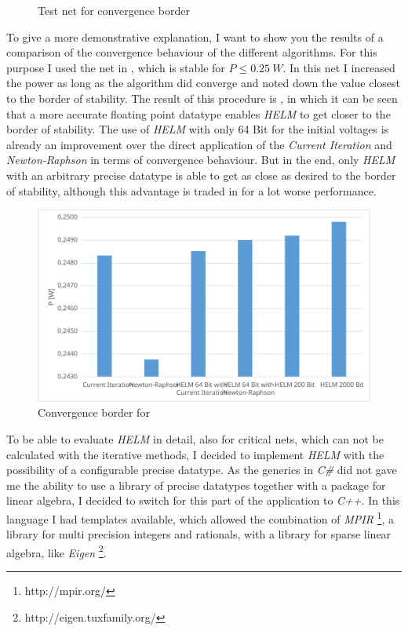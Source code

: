 \begin{figure}
	\centering
	
	\caption{Test net for convergence border}
	\label{fig:convergence_border_net}
\end{figure}

To give a more demonstrative explanation, I want to show you the results of a comparison of the convergence behaviour of the different algorithms. For this purpose I used the net in , which is stable for $P \le \SI{0.25}{W}$. In this net I increased the power as long as the algorithm did converge and noted down the value closest to the border of stability. The result of this procedure is , in which it can be seen that a more accurate floating point datatype enables \emph{HELM} to get closer to the border of stability. The use of \emph{HELM} with only 64 Bit for the initial voltages is already an improvement over the direct application of the \emph{Current Iteration} and \emph{Newton-Raphson} in terms of convergence behaviour. But in the end, only \emph{HELM} with an arbitrary precise datatype is able to get as close as desired to the border of stability, although this advantage is traded in for a lot worse performance.

\begin{figure}
	\centering
	\includegraphics[scale=0.7]{figures/convergence_border}
	\caption{Convergence border for }
	\label{fig:convergence_border}
\end{figure}

To be able to evaluate \emph{HELM} in detail, also for critical nets, which can not be calculated with the iterative methods, I decided to implement \emph{HELM} with the possibility of a configurable precise datatype. As the generics in \emph{C\#} did not gave me the ability to use a library of precise datatypes together with a package for linear algebra, I decided to switch for this part of the application to \emph{C++}. In this language I had templates available, which allowed the combination of \emph{MPIR} \footnote{http://mpir.org/}, a library for multi precision integers and rationals, with a library for sparse linear algebra, like \emph{Eigen} \footnote{http://eigen.tuxfamily.org/}.

